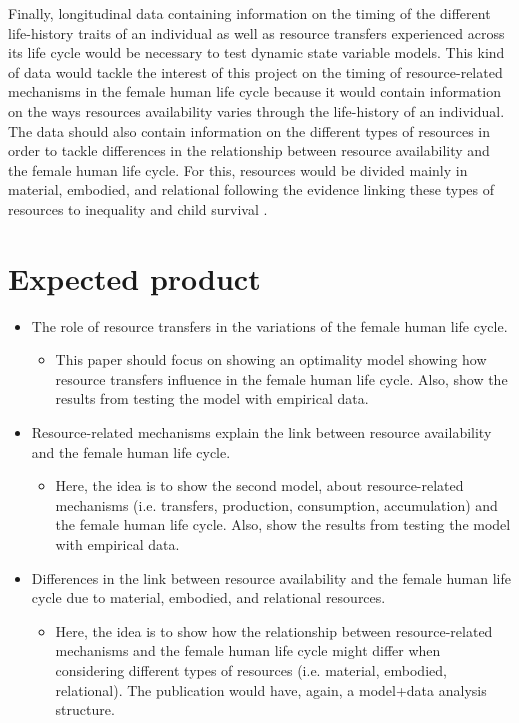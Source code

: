 \documentclass{article}
\begin{document}
Finally, longitudinal data containing information on the timing of the different life-history traits of an individual as well as resource transfers experienced across its life cycle would be necessary to test dynamic state variable models. This kind of data would tackle the interest of this project on the timing of resource-related mechanisms in the female human life cycle because it would contain information on the ways resources availability  varies through the life-history of an individual. The data should also contain information on the different types of resources in order to tackle differences in the relationship between resource availability and the female human life cycle. For this, resources would be divided mainly in material, embodied, and relational following the evidence linking these types of resources to inequality and child survival \citep{mulder2009intergenerational,mulder2011understanding}.

\section{Expected product}

\begin{itemize}
    \item The role of resource transfers in the variations of the female human life cycle.
    \begin{itemize}
        \item This paper should focus on showing an optimality model showing how resource transfers influence in the female human life cycle. Also, show the results from testing the model with empirical data.
    \end{itemize}
    \item Resource-related mechanisms explain the link between resource availability and the female human life cycle.
    \begin{itemize}
        \item Here, the idea is to show the second model, about resource-related mechanisms (i.e. transfers, production, consumption, accumulation) and the female human life cycle. Also, show the results from testing the model with empirical data.
    \end{itemize}
    \item Differences in the link between resource availability and the female human life cycle due to material, embodied, and relational resources.
    \begin{itemize}
        \item Here, the idea is to show how the relationship between resource-related mechanisms and the female human life cycle might differ when considering different types of resources (i.e. material, embodied, relational). The publication would have, again, a model+data analysis structure.
    \end{itemize}
\end{itemize}
\end{document}
